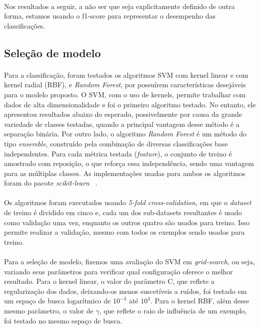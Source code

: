                 \paragraph{} Nos resultados a seguir, a não ser que seja explicitamente definido de outra forma, estamos usando o f1-score para representar o desempenho das classificações.

        \subsection{Seleção de modelo}
        
            \paragraph{} Para a classificação, foram testados os algoritmos SVM com kernel linear e com kernel radial (RBF), e \textit{Random Forest}, por possuírem características desejáveis para o modelo proposto. O SVM, com o uso de kernels, permite trabalhar com dados de alta dimensionalidade e foi o primeiro algoritmo testado. No entanto, ele apresentou resultados abaixo do esperado, possivelmente por causa da grande variedade de classes testadas, quando a principal vantagem desse método é a separação binária. Por outro lado, o algoritmo \textit{Random Forest} é um método do tipo \textit{ensemble}, construído pela combinação de diversas classificações base independentes. Para cada métrica testada (\textit{feature}), o conjunto de treino é amostrado com reposição, o que reforça essa independência, sendo uma vantagem para as múltiplas classes. As implementações usadas para ambos os algoritmos foram do pacote \textit{scikit-learn} ~\cite{scikit}.
            
            \paragraph{} Os algoritmos foram executados usando \textit{5-fold cross-validation}, em que o \textit{dataset} de treino é dividido em cinco e, cada um dos sub-datasets resultantes é usado como validação uma vez, enquanto os outros quatro são usados para treino. Isso permite realizar a validação, mesmo com todos os exemplos sendo usados para treino. 
            
            \paragraph{} Para a seleção de modelo, fizemos uma avaliação do SVM em \textit{grid-search}, ou seja, variando seus parâmetros para verificar qual configuração oferece o melhor resultado. Para o kernel linear, o valor do parâmetro C, que reflete a regularização dos dados, deixando-os menos suscetíveis a ruídos, foi testado em um espaço de busca logarítmico de $10^{-3}$ até $10^{3}$. Para o kernel RBF, além desse mesmo parâmetro, o valor de $\gamma$, que reflete o raio de influência de um exemplo, foi testado no mesmo espaço de busca.
        
